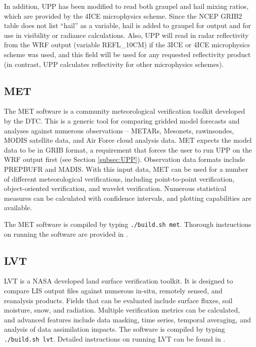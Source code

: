 In addition, UPP has been modified to read both graupel and hail mixing
ratios, which are provided by the 4ICE microphysics scheme.  Since the
NCEP GRIB2 table does not list ``hail'' as a variable, hail is added to
graupel for output and for use in visibility or radiance calculations.  Also,
UPP will read in radar reflectivity from the WRF output (variable
REFL\_10CM) if the 3ICE or 4ICE microphysics scheme was used, and this
field will be used for any requested reflectivity product (in contrast,
UPP calculates reflectivity for other microphysics schemes).

\subsection{MET}

The MET software is a community meteorological verification toolkit developed
by the DTC. This is a generic tool for comparing gridded model forecasts
and analyses against numerous observations -- METARs, Mesonets, rawinsondes,
MODIS satellite data, and Air Force cloud analysis data. MET expects the
model data to be in GRIB format, a requirement that forces the user to 
run UPP on the WRF output first (see Section \ref{subsec:UPP}). Observation
data formats include PREPBUFR and MADIS. With this input data, MET can be
used for a number of different meteorological verifications, including 
point-to-point verification, object-oriented verification, and wavelet
verification. Numerous statistical measures can be calculated with
confidence intervals, and plotting capabilities are available. 

The MET software is compiled by typing \texttt{./build.sh met}. Thorough 
instructions on running the software are provided in \cite{ref:MetUserGuide}.

\subsection{LVT}

LVT is a NASA developed land surface verification toolkit. It is designed
to compare LIS output files against numerous in-situ, remotely sensed,
and reanalysis products. Fields that can be evaluated include surface
fluxes, soil moisture, snow, and radiation. Multiple verification metrics
can be calculated, and advanced features include data masking, time series,
temporal averaging, and analysis of data assimilation impacts. The software
is compiled by typing \texttt{./build.sh lvt}.  Detailed instructions on 
running LVT can be found in \cite{ref:LvtUserGuide}.

